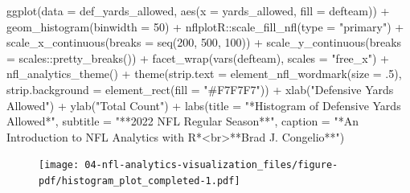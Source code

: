 \documentclass[
  letterpaper,
]{krantz}
\newenvironment{Shaded}{\begin{snugshade}}{\end{snugshade}}
\newcommand{\AttributeTok}[1]{\textcolor[rgb]{0.40,0.45,0.13}{#1}}
\newcommand{\DecValTok}[1]{\textcolor[rgb]{0.68,0.00,0.00}{#1}}
\newcommand{\FunctionTok}[1]{\textcolor[rgb]{0.28,0.35,0.67}{#1}}
\newcommand{\NormalTok}[1]{\textcolor[rgb]{0.00,0.23,0.31}{#1}}
\newcommand{\SpecialCharTok}[1]{\textcolor[rgb]{0.37,0.37,0.37}{#1}}
\newcommand{\StringTok}[1]{\textcolor[rgb]{0.13,0.47,0.30}{#1}}
\begin{document}
\begin{Shaded}
\begin{Highlighting}[]
\FunctionTok{ggplot}\NormalTok{(}\AttributeTok{data =}\NormalTok{ def\_yards\_allowed, }\FunctionTok{aes}\NormalTok{(}\AttributeTok{x =}\NormalTok{ yards\_allowed, }\AttributeTok{fill =}\NormalTok{ defteam)) }\SpecialCharTok{+}
  \FunctionTok{geom\_histogram}\NormalTok{(}\AttributeTok{binwidth =} \DecValTok{50}\NormalTok{) }\SpecialCharTok{+}
\NormalTok{  nflplotR}\SpecialCharTok{::}\FunctionTok{scale\_fill\_nfl}\NormalTok{(}\AttributeTok{type =} \StringTok{"primary"}\NormalTok{) }\SpecialCharTok{+}
  \FunctionTok{scale\_x\_continuous}\NormalTok{(}\AttributeTok{breaks =} \FunctionTok{seq}\NormalTok{(}\DecValTok{200}\NormalTok{, }\DecValTok{500}\NormalTok{, }\DecValTok{100}\NormalTok{)) }\SpecialCharTok{+}
  \FunctionTok{scale\_y\_continuous}\NormalTok{(}\AttributeTok{breaks =}\NormalTok{ scales}\SpecialCharTok{::}\FunctionTok{pretty\_breaks}\NormalTok{()) }\SpecialCharTok{+}
  \FunctionTok{facet\_wrap}\NormalTok{(}\FunctionTok{vars}\NormalTok{(defteam), }\AttributeTok{scales =} \StringTok{"free\_x"}\NormalTok{) }\SpecialCharTok{+}
  \FunctionTok{nfl\_analytics\_theme}\NormalTok{() }\SpecialCharTok{+}
  \FunctionTok{theme}\NormalTok{(}\AttributeTok{strip.text =} \FunctionTok{element\_nfl\_wordmark}\NormalTok{(}\AttributeTok{size =}\NormalTok{ .}\DecValTok{5}\NormalTok{),}
        \AttributeTok{strip.background =} \FunctionTok{element\_rect}\NormalTok{(}\AttributeTok{fill =} \StringTok{"\#F7F7F7"}\NormalTok{)) }\SpecialCharTok{+}
  \FunctionTok{xlab}\NormalTok{(}\StringTok{"Defensive Yards Allowed"}\NormalTok{) }\SpecialCharTok{+}
  \FunctionTok{ylab}\NormalTok{(}\StringTok{"Total Count"}\NormalTok{) }\SpecialCharTok{+}
  \FunctionTok{labs}\NormalTok{(}\AttributeTok{title =} \StringTok{"*Histogram of Defensive Yards Allowed*"}\NormalTok{,}
       \AttributeTok{subtitle =} \StringTok{"**2022 NFL Regular Season**"}\NormalTok{,}
       \AttributeTok{caption =} \StringTok{"*An Introduction to NFL Analytics with R*\textless{}br\textgreater{}**Brad J. Congelio**"}\NormalTok{)}
\end{Highlighting}
\end{Shaded}

\begin{figure}[H]

{\centering \texttt{[image: 04-nfl-analytics-visualization\_files/figure-pdf/histogram\_plot\_completed-1.pdf]}

}

\end{figure}
\end{document}

